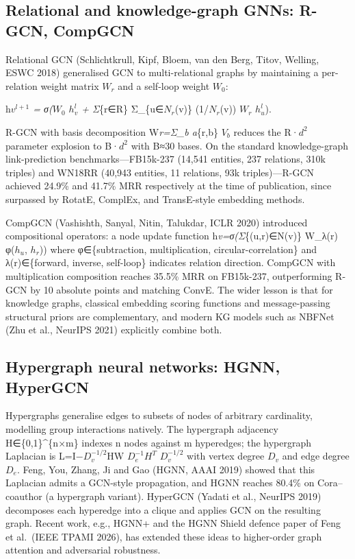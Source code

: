 \subsection{Relational and knowledge-graph GNNs: R-GCN, CompGCN}\label{relational-and-knowledge-graph-gnns-r-gcn-compgcn}

Relational GCN (Schlichtkrull, Kipf, Bloem, van den Berg, Titov, Welling, ESWC 2018) generalised GCN to multi-relational graphs by maintaining a per-relation weight matrix \(W_r\) and a self-loop weight \(W_0\):

h\emph{\(v^{l+1}\) = σ(\(W_0\) \(h_v^l\) + Σ}\{r∈R\} Σ\_\{u∈\(N_r\)(v)\} (1/\textbar{}\(N_r\)(v)\textbar) \(W_r\) \(h_u^l\)).

R-GCN with basis decomposition W\emph{r=Σ\_b a}\{r,b\} \(V_b\) reduces the \textbar R\textbar·\(d^2\) parameter explosion to B·\(d^2\) with B≈30 bases. On the standard knowledge-graph link-prediction benchmarks---FB15k-237 (14,541 entities, 237 relations, 310k triples) and WN18RR (40,943 entities, 11 relations, 93k triples)---R-GCN achieved 24.9\% and 41.7\% MRR respectively at the time of publication, since surpassed by RotatE, ComplEx, and TransE-style embedding methods.

CompGCN (Vashishth, Sanyal, Nitin, Talukdar, ICLR 2020) introduced compositional operators: a node update function h\emph{v=σ(Σ}\{(u,r)∈N(v)\} W\_λ(r) φ(\(h_u\), \(h_r\))) where φ∈\{subtraction, multiplication, circular-correlation\} and λ(r)∈\{forward, inverse, self-loop\} indicates relation direction. CompGCN with multiplication composition reaches 35.5\% MRR on FB15k-237, outperforming R-GCN by 10 absolute points and matching ConvE. The wider lesson is that for knowledge graphs, classical embedding scoring functions and message-passing structural priors are complementary, and modern KG models such as NBFNet (Zhu et al., NeurIPS 2021) explicitly combine both.

\subsection{Hypergraph neural networks: HGNN, HyperGCN}\label{hypergraph-neural-networks-hgnn-hypergcn}

Hypergraphs generalise edges to subsets of nodes of arbitrary cardinality, modelling group interactions natively. The hypergraph adjacency H∈\{0,1\}\^{}\{n×m\} indexes n nodes against m hyperedges; the hypergraph Laplacian is L=I−\(D_v^{−1/2}\)HW \(D_e^{−1}\)\(H^T\) \(D_v^{−1/2}\) with vertex degree \(D_v\) and edge degree \(D_e\). Feng, You, Zhang, Ji and Gao (HGNN, AAAI 2019) showed that this Laplacian admits a GCN-style propagation, and HGNN reaches 80.4\% on Cora--coauthor (a hypergraph variant). HyperGCN (Yadati et al., NeurIPS 2019) decomposes each hyperedge into a clique and applies GCN on the resulting graph. Recent work, e.g., HGNN+ and the HGNN Shield defence paper of Feng et al.~(IEEE TPAMI 2026), has extended these ideas to higher-order graph attention and adversarial robustness.

